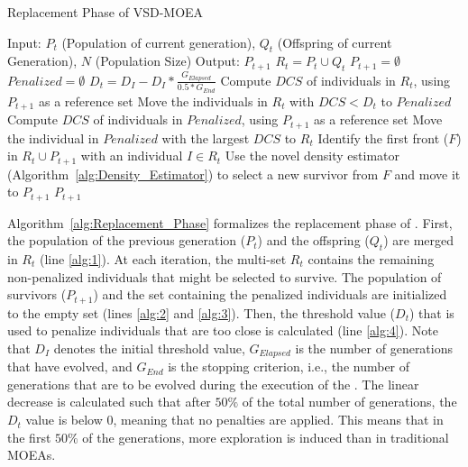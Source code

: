 \begin{algorithm}[t]
	\caption{Replacement Phase of VSD-MOEA} 
\begin{small}
\begin{algorithmic}[1]
\STATE Input: $P_t$ (Population of current generation), $Q_t$ (Offspring of current Generation), $N$ (Population Size)
    	\STATE Output: $P_{t+1}$ 
        \STATE $R_t = P_t \cup Q_t$ \label{alg:1}
        \STATE $P_{t+1} = \emptyset$ \label{alg:2}
        \STATE $Penalized = \emptyset$ \label{alg:3}
				\STATE $D_t = D_I - D_I * \frac{G_{Elapsed}}{0.5*G_{End}}$ \label{alg:4}
         \label{alg:6}
					\STATE Compute $DCS$ of individuals in $R_t$, using $P_{t+1}$ as a reference set \label{alg:7}
					\STATE Move the individuals in $R_t$ with $DCS < D_t$ to $Penalized$ \label{alg:8}
        	 \label{alg:9}
						\STATE Compute $DCS$ of individuals in $Penalized$, using $P_{t+1}$ as a reference set \label{alg:10}
						\STATE Move the individual in $Penalized$ with the largest $DCS$ to $R_t$ \label{alg:11}
        	\ENDIF
					\STATE Identify the first front ($F$) in $R_t \cup P_{t+1}$ with an individual $I \in R_t$ \label{alg:12}
					\STATE Use the novel density estimator (Algorithm~\ref{alg:Density_Estimator}) to select a new survivor 
					from $F$ and move it to $P_{t+1}$\label{alg:13}
        \ENDWHILE
    	\RETURN $P_{t+1}$ \label{alg:14}
	\end{algorithmic}
\end{small}
\label{alg:Replacement_Phase}
\end{algorithm}

Algorithm~\ref{alg:Replacement_Phase} formalizes the replacement phase of \VSDMOEA{}.
%
First, the population of the previous generation ($P_t$) and the offspring ($Q_t$) are merged
in $R_t$ (line \ref{alg:1}).
%
At each iteration, the multi-set $R_t$ contains the remaining non-penalized individuals that might be selected 
to survive.
%
The population of survivors ($P_{t+1}$) and the set containing the penalized individuals are initialized to
the empty set (lines \ref{alg:2} and \ref{alg:3}).
%
Then, the threshold value ($D_t$) that is used to penalize individuals that are too close is calculated (line \ref{alg:4}).
%
Note that $D_I$ denotes the initial threshold value, $G_{Elapsed}$ is the number of generations that have 
evolved, and $G_{End}$ is the stopping criterion, i.e., the number of generations that are to be evolved 
during the execution of the \VSDMOEA{}.
%
The linear decrease is calculated such that after $50\%$ of the total number of 
generations, the $D_t$ value is below 0, meaning that no penalties are applied.
%
This means that in the first $50\%$ of the generations, more exploration is induced than in traditional MOEAs.
%

